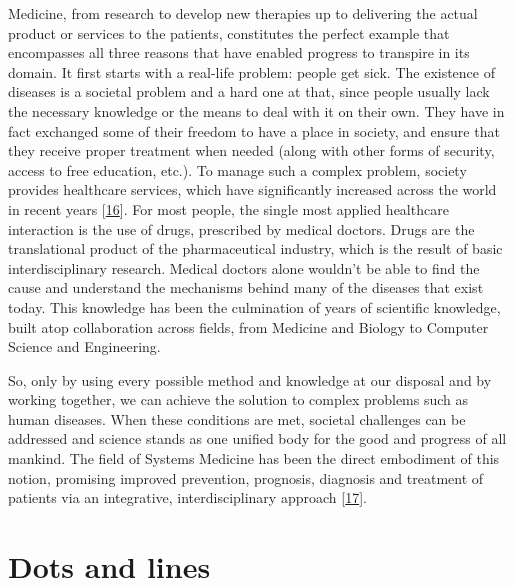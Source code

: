 \documentclass[
  12pt,
]{book}
\begin{document}
Medicine, from research to develop new therapies up to delivering the actual product or services to the patients, constitutes the perfect example that encompasses all three reasons that have enabled progress to transpire in its domain.
It first starts with a real-life problem: people get sick.
The existence of diseases is a societal problem and a hard one at that, since people usually lack the necessary knowledge or the means to deal with it on their own.
They have in fact exchanged some of their freedom to have a place in society, and ensure that they receive proper treatment when needed (along with other forms of security, access to free education, etc.).
To manage such a complex problem, society provides healthcare services, which have significantly increased across the world in recent years {[}\protect\hyperlink{ref-HAQ2015}{16}{]}.
For most people, the single most applied healthcare interaction is the use of drugs, prescribed by medical doctors.
Drugs are the translational product of the pharmaceutical industry, which is the result of basic interdisciplinary research.
Medical doctors alone wouldn't be able to find the cause and understand the mechanisms behind many of the diseases that exist today.
This knowledge has been the culmination of years of scientific knowledge, built atop collaboration across fields, from Medicine and Biology to Computer Science and Engineering.

So, only by using every possible method and knowledge at our disposal and by working together, we can achieve the solution to complex problems such as human diseases.
When these conditions are met, societal challenges can be addressed and science stands as one unified body for the good and progress of all mankind.
The field of Systems Medicine has been the direct embodiment of this notion, promising improved prevention, prognosis, diagnosis and treatment of patients via an integrative, interdisciplinary approach {[}\protect\hyperlink{ref-Apweiler2018}{17}{]}.

\newpage

\hypertarget{dots-and-lines}{%
\section*{Dots and lines}\label{dots-and-lines}}

\indent
\end{document}
